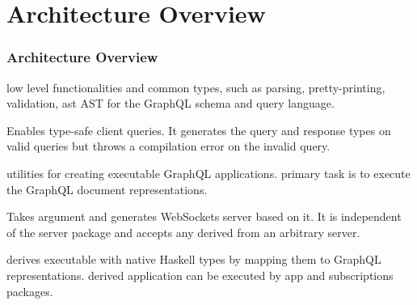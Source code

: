 \section{Architecture Overview}

\begin{frame}\frametitle{Architecture Overview}

\begin{enumerate} 

  \footnotesize
  
   low level functionalities and common types, such as  parsing, pretty-printing, validation, ast AST for the GraphQL schema and query language.

   Enables type-safe client queries. It generates the query and response types on valid queries but throws a compilation error on the invalid query.

   utilities for creating executable GraphQL applications. primary task is to execute the GraphQL document representations. 
  
   Takes argument  and generates  WebSockets server based on it. It is independent of the server package and accepts any  derived from an arbitrary server.

   derives executable  with native Haskell types by mapping them to GraphQL representations. derived application can be executed by app and subscriptions packages.


\end{enumerate}

\end{frame}

\begin{frame}

\end{frame}
